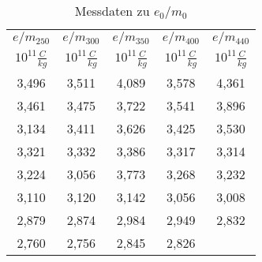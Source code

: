 



%


\begin{table}[h!]
  \centering
  \caption{Messdaten zu $e_0/m_0$}
  \label{tab:em}
  \begin{tabular}{c c c c c }
    \toprule
     $e/m_{250}$ & $e/m_{300}$ & $e/m_{350}$ & $e/m_{400}$ & $e/m_{440}$\\
       $10^{11}\frac{C}{kg}$ &     $10^{11}\frac{C}{kg}$ &    $10^{11}\frac{C}{kg}$ &     $10^{11}\frac{C}{kg}$ &    $10^{11}\frac{C}{kg}$   \\
    \midrule
    3,496  &   3,511  &  4,089 &  3,578  &  4,361\\
    3,461  &   3,475  &  3,722 &  3,541  &  3,896\\
    3,134  &   3,411  &  3,626 &  3,425  &  3,530\\
    3,321  &   3,332  &  3,386 &  3,317  &  3,314\\
    3,224  &   3,056  &  3,773 &  3,268  &  3,232\\
    3,110  &   3,120  &  3,142 &  3,056  &  3,008\\
    2,879  &   2,874  &  2,984 &  2,949  &  2,832\\
    2,760  &   2,756  &  2,845 &  2,826  &\\


    \bottomrule
  \end{tabular}
\end{table}

%




